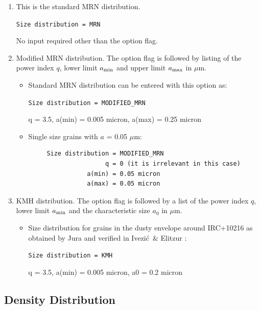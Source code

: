 \documentclass[11pt]{article}
\def\mic    {\hbox{$\mu$m}}
\def\Ivezic {Ivezi\'c}
\begin{document}
\begin{enumerate}

\item This is the standard MRN distribution.

{\tt  Size distribution = MRN}

No input required other than the option flag.

\item Modified MRN distribution.  The option flag is followed by listing of the
power index $q$, lower limit $a_{\rm min}$ and upper limit $a_{\rm max}$ in
\mic.

\begin{itemize}
\item
Standard MRN distribution can be entered with this option as:

{\tt  Size distribution = MODIFIED\_MRN

 q = 3.5, a(min) = 0.005 micron, a(max) = 0.25 micron}

\item Single size grains with $a$ = 0.05 \mic:

\begin{verbatim}
     Size distribution = MODIFIED_MRN
                     q = 0 (it is irrelevant in this case)
                a(min) = 0.05 micron
                a(max) = 0.05 micron
\end{verbatim}
\end{itemize}

\item
KMH distribution.  The option flag is followed by a list of the power
index $q$, lower limit $a_{\rm min}$ and the characteristic size $a_0$ in \mic.

\begin{itemize}
\item Size distribution for grains in the dusty envelope around IRC+10216 as
obtained by Jura \cite{Jura} and verified in \Ivezic\ \& Elitzur \cite{IE96b}:

{\tt  Size distribution = KMH

 q = 3.5, a(min) = 0.005 micron, a0 = 0.2 micron}

\end{itemize}
\end{enumerate}

\subsection{Density Distribution}
\label{density}
\end{document}
